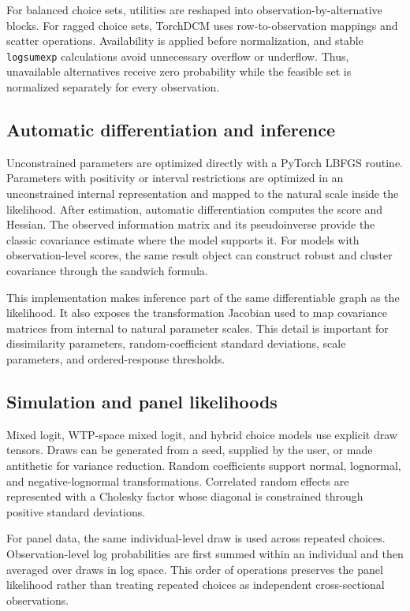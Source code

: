 \documentclass[11pt]{article}
\begin{document}
For balanced choice sets, utilities are reshaped into observation-by-alternative
blocks. For ragged choice sets, TorchDCM uses row-to-observation mappings and
scatter operations. Availability is applied before normalization, and stable
\texttt{logsumexp} calculations avoid unnecessary overflow or underflow. Thus,
unavailable alternatives receive zero probability while the feasible set is
normalized separately for every observation.

\subsection{Automatic differentiation and inference}

Unconstrained parameters are optimized directly with a PyTorch LBFGS routine.
Parameters with positivity or interval restrictions are optimized in an
unconstrained internal representation and mapped to the natural scale inside
the likelihood. After estimation, automatic differentiation computes the score
and Hessian. The observed information matrix and its pseudoinverse provide the
classic covariance estimate where the model supports it. For models with
observation-level scores, the same result object can construct robust and
cluster covariance through the sandwich formula.

This implementation makes inference part of the same differentiable graph as
the likelihood. It also exposes the transformation Jacobian used to map
covariance matrices from internal to natural parameter scales. This detail is
important for dissimilarity parameters, random-coefficient standard deviations,
scale parameters, and ordered-response thresholds.

\subsection{Simulation and panel likelihoods}

Mixed logit, WTP-space mixed logit, and hybrid choice models use explicit draw
tensors. Draws can be generated from a seed, supplied by the user, or made
antithetic for variance reduction. Random coefficients support normal,
lognormal, and negative-lognormal transformations. Correlated random effects
are represented with a Cholesky factor whose diagonal is constrained through
positive standard deviations.

For panel data, the same individual-level draw is used across repeated choices.
Observation-level log probabilities are first summed within an individual and
then averaged over draws in log space. This order of operations preserves the
panel likelihood rather than treating repeated choices as independent
cross-sectional observations.
\end{document}
